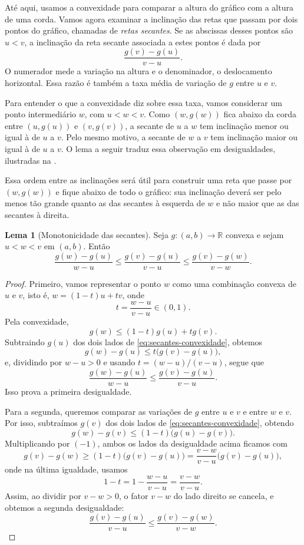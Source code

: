 \documentclass[12pt,portuguese]{article}
\theoremstyle{definition}
\newtheorem{lemma}[lemma]{Lema}
\theoremstyle{plainexercise}
\theoremstyle{starredexercise}
\theoremstyle{definition}
\begin{document}
Até aqui, usamos a convexidade para comparar a altura do gráfico com a
altura de uma corda. Vamos agora examinar a inclinação das retas que passam
por dois pontos do gráfico, chamadas de \emph{retas secantes}. Se as
abscissas desses pontos são $u<v$, a inclinação da reta secante associada a estes pontos é
dada por
\[
\frac{g(v)-g(u)}{v-u}.
\]
O numerador mede a variação na altura e o denominador, o deslocamento
horizontal. Essa razão é também a taxa média de variação de $g$ entre
$u$ e $v$.

Para entender o que a convexidade diz sobre essa taxa, vamos considerar um ponto
intermediário $w$, com $u<w<v$. Como $(w,g(w))$ fica abaixo da corda entre
$(u,g(u))$ e $(v,g(v))$, a secante de $u$ a $w$ tem inclinação menor ou
igual à de $u$ a $v$. Pelo mesmo motivo, a secante de $w$ a $v$ tem
inclinação maior ou igual à de $u$ a $v$. O lema a seguir traduz essa
observação em desigualdades, ilustradas na .



Essa ordem entre as inclinações será útil
para construir uma reta que passe por $(w,g(w))$ e fique abaixo de todo
o gráfico: sua inclinação deverá ser pelo menos tão grande quanto as das
secantes à esquerda de $w$ e não maior que as das secantes à direita.

\begin{lemma}[Monotonicidade das secantes]\label{lem:secantes}
Seja $g\colon(a,b)\to\mathbb{R}$ convexa e sejam $u<w<v$ em $(a,b)$. Então
\begin{equation}\label{eq:secantes}
\frac{g(w)-g(u)}{w-u}
\leqslant
\frac{g(v)-g(u)}{v-u}
\leqslant
\frac{g(v)-g(w)}{v-w}.
\end{equation}
\end{lemma}

\begin{proof}
Primeiro, vamos representar o ponto $w$ como uma combinação convexa de $u$ e $v$, isto é, $w=(1-t)u+tv$, onde
\[
t=\frac{w-u}{v-u}\in(0,1).
\]
Pela convexidade,
\begin{equation}\label{eq:secantes-convexidade}
g(w)\leqslant(1-t)g(u)+tg(v).
\end{equation}
Subtraindo $g(u)$ dos dois lados de \eqref{eq:secantes-convexidade}, obtemos
\[
g(w)-g(u)
\leqslant
t\bigl(g(v)-g(u)\bigr),
\]
e, dividindo por $w-u>0$ e usando $t=(w-u)/(v-u)$, segue que
\[
\frac{g(w)-g(u)}{w-u}
\leqslant
\frac{g(v)-g(u)}{v-u}.
\]
Isso prova a primeira desigualdade. 


Para a segunda, queremos comparar as
variações de $g$ entre $u$ e $v$ e entre $w$ e $v$. Por isso, subtraímos
$g(v)$ dos dois lados de \eqref{eq:secantes-convexidade}, obtendo
\[
g(w)-g(v)
\leqslant
(1-t)\bigl(g(u)-g(v)\bigr).
\]
Multiplicando por $(-1)$, ambos os lados da desigualdade acima ficamos com 
\[
g(v)-g(w)
\geqslant
(1-t)\bigl(g(v)-g(u)\bigr)
=\frac{v-w}{v-u}\bigl(g(v)-g(u)\bigr),
\]
onde na última igualdade, usamos
\[
1-t=1-\frac{w-u}{v-u}=\frac{v-w}{v-u}.
\]
Assim, ao dividir por $v-w>0$, o fator $v-w$ do lado direito se cancela,
e obtemos a segunda desigualdade:
\[
\frac{g(v)-g(u)}{v-u}
\leqslant
\frac{g(v)-g(w)}{v-w}.
\]
\end{proof}
\end{document}

